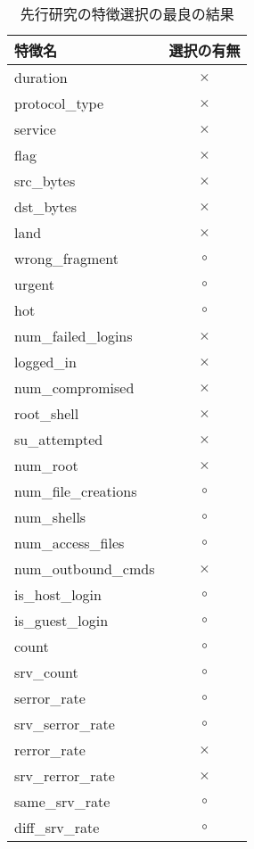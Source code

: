   \begin{table}[htbp]
    \centering
    \caption{先行研究の特徴選択の最良の結果}
    \begin{tabular}{|l|c|}
        \hline
        \textbf{特徴名} & \textbf{選択の有無} \\
        \hline
        duration & \(\times\) \\
        protocol\_type & \(\times\) \\
        service & \(\times\) \\
        flag & \(\times\) \\
        src\_bytes & \(\times\) \\
        dst\_bytes & \(\times\) \\
        land & \(\times\) \\
        wrong\_fragment & \(\circ\) \\
        urgent & \(\circ\) \\
        hot & \(\circ\) \\
        num\_failed\_logins & \(\times\) \\
        logged\_in & \(\times\) \\
        num\_compromised & \(\times\) \\
        root\_shell & \(\times\) \\
        su\_attempted & \(\times\) \\
        num\_root & \(\times\) \\
        num\_file\_creations & \(\circ\) \\
        num\_shells & \(\circ\) \\
        num\_access\_files & \(\circ\) \\
        num\_outbound\_cmds & \(\times\) \\
        is\_host\_login & \(\circ\) \\
        is\_guest\_login & \(\circ\) \\
        count & \(\circ\) \\
        srv\_count & \(\circ\) \\
        serror\_rate & \(\circ\) \\
        srv\_serror\_rate & \(\circ\) \\
        rerror\_rate & \(\times\) \\
        srv\_rerror\_rate & \(\times\) \\
        same\_srv\_rate & \(\circ\) \\
        diff\_srv\_rate & \(\circ\) \\

\end{tabular}
\end{table}
